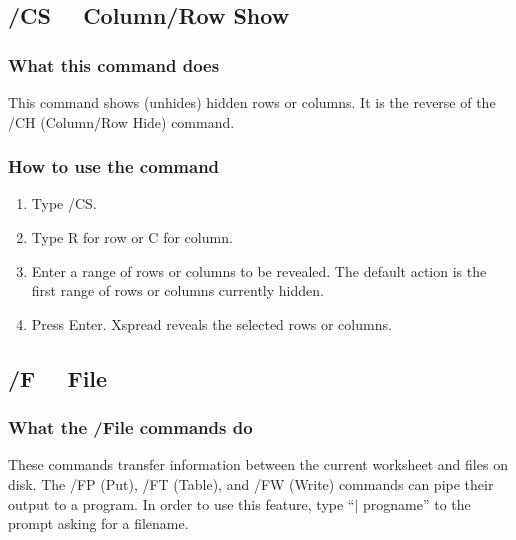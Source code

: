 \subsection*{/CS \ \     Column/Row Show}

\subsubsection*{What this command does}
This command shows (unhides) hidden rows or columns.  It is the 
reverse of the /CH (Column/Row Hide) command.

\subsubsection*{How to use the command}
\begin{enumerate}
\item{Type /CS.}
\item{Type R for row or C for column.}
\item{Enter a range of rows or columns to be revealed.  The default
action is the first range of rows or columns currently hidden.}
\item{Press Enter.  Xspread reveals the selected rows or columns.}
\end{enumerate}

\subsection*{/F  \ \     File}
        
\subsubsection*{What the /File commands do}
These commands transfer information between the current worksheet and 
files on disk.  The /FP (Put), /FT (Table), and /FW (Write) commands 
can pipe their output to a program.  In order to use this feature, 
type ``$|$ progname'' to the prompt asking for a filename.

